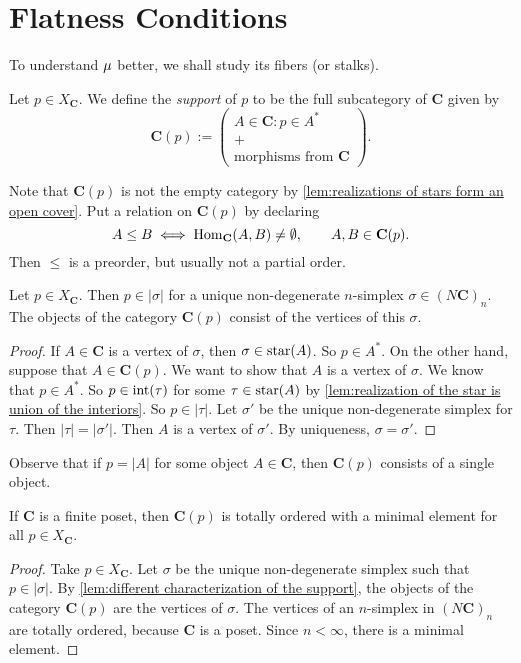 \section{Flatness Conditions}

To understand $\operatorname{\mu}$ better, we shall study its fibers (or stalks).

\begin{definition}
\label{def:support at a point}
Let $p \in X_\mathbf{C}$. We define the \emph{support} of $p$ to be the full subcategory of $\mathbf{C}$ given by
\[ \mathbf{C}(p) := \left(\begin{array}{c} A \in \mathbf{C} : p \in A^* \\ + \\ \text{morphisms from $\mathbf{C}$} \end{array} \right). \]
\end{definition}
Note that $\mathbf{C}(p)$ is not the empty category by \cref{lem:realizations of stars form an open cover}. Put a relation on $\mathbf{C}(p)$ by declaring
\[ A \leq B \iff \operatorname{Hom}_\mathbf{C}(A,B) \neq \emptyset, \qquad A,B \in \mathbf{C}(p). \]
Then $\leq$ is a preorder, but usually not a partial order.

\begin{lemma}
\label{lem:different characterization of the support}
Let $p \in X_{\mathbf{C}}$. Then $p \in |\sigma|$ for a unique non-degenerate $n$-simplex $\sigma \in (N\mathbf{C})_n$. The objects of the category $\mathbf{C}(p)$ consist of the vertices of this $\sigma$.
\end{lemma}
\begin{proof}
If $A \in \mathbf{C}$ is a vertex of $\sigma$, then $\sigma \in \operatorname{star}(A)$. So $p \in A^*$. On the other hand, suppose that $A \in \mathbf{C}(p)$. We want to show that $A$ is a vertex of $\sigma$. We know that $p \in A^*$. So $p \in \operatorname{int}(\tau)$ for some $\tau \in \operatorname{star}(A)$ by \cref{lem:realization of the star is union of the interiors}. So $p \in |\tau|$. Let $\sigma'$ be the unique non-degenerate simplex for $\tau$. Then $|\tau| = |\sigma'|$. Then $A$ is a vertex of $\sigma'$. By uniqueness, $\sigma = \sigma'$.
\end{proof}

Observe that if $p =|A|$ for some object $A \in \mathbf{C}$, then $\mathbf{C}(p)$ consists of a single object.

\begin{lemma}
If $\mathbf{C}$ is a finite poset, then $\mathbf{C}(p)$ is totally ordered with a minimal element for all $p \in X_{\mathbf{C}}$.
\end{lemma}
\begin{proof}
Take $p \in X_{\mathbf{C}}$. Let $\sigma$ be the unique non-degenerate simplex such that $p \in |\sigma|$. By \cref{lem:different characterization of the support}, the objects of the category $\mathbf{C}(p)$ are the vertices of $\sigma$. The vertices of an $n$-simplex in $(N\mathbf{C})_n$ are totally ordered, because $\mathbf{C}$ is a poset. Since $n < \infty$, there is a minimal element.
\end{proof}

